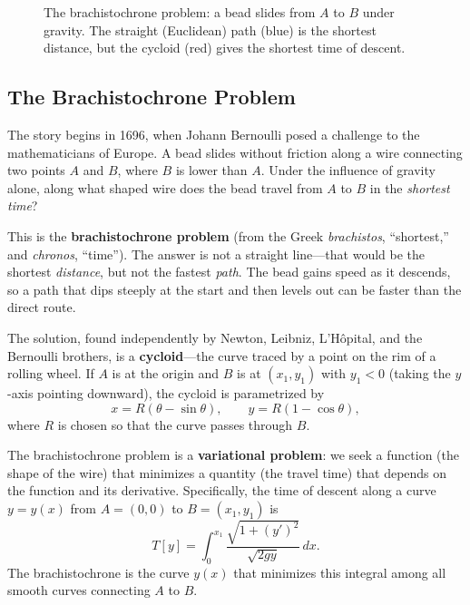 \begin{figure}[htbp]
\centering
{}
\caption{The brachistochrone problem: a bead slides from $A$ to $B$ under gravity. The straight (Euclidean) path (blue) is the shortest distance, but the cycloid (red) gives the shortest time of descent.}
\label{fig:brachistochrone}
\end{figure}

\subsection{The Brachistochrone Problem}

The story begins in 1696, when Johann Bernoulli posed a challenge to the mathematicians of Europe. A bead slides without friction along a wire connecting two points $A$ and $B$, where $B$ is lower than $A$. Under the influence of gravity alone, along what shaped wire does the bead travel from $A$ to $B$ in the \emph{shortest time}?

This is the \textbf{brachistochrone problem} (from the Greek \emph{brachistos}, ``shortest,'' and \emph{chronos}, ``time''). The answer is not a straight line---that would be the shortest \emph{distance}, but not the fastest \emph{path}. The bead gains speed as it descends, so a path that dips steeply at the start and then levels out can be faster than the direct route.

The solution, found independently by Newton, Leibniz, L'H\^opital, and the Bernoulli brothers, is a \textbf{cycloid}---the curve traced by a point on the rim of a rolling wheel. If $A$ is at the origin and $B$ is at $(x_1, y_1)$ with $y_1 < 0$ (taking the $y$-axis pointing downward), the cycloid is parametrized by
\[
    x = R(\theta - \sin\theta), \qquad y = R(1 - \cos\theta),
\]
where $R$ is chosen so that the curve passes through $B$.

The brachistochrone problem is a \textbf{variational problem}: we seek a function (the shape of the wire) that minimizes a quantity (the travel time) that depends on the function and its derivative. Specifically, the time of descent along a curve $y = y(x)$ from $A = (0,0)$ to $B = (x_1, y_1)$ is
\[
    T[y] = \int_0^{x_1} \frac{\sqrt{1 + (y')^2}}{\sqrt{2gy}} \, dx.
\]
The brachistochrone is the curve $y(x)$ that minimizes this integral among all smooth curves connecting $A$ to $B$.


